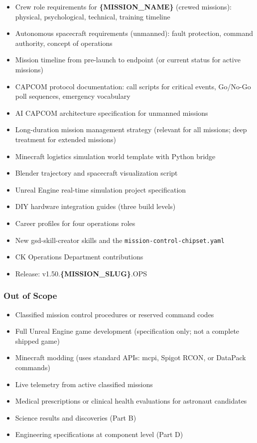 \documentclass[11pt,letterpaper]{article}
\newcommand{\param}[1]{\textcolor{paramred}{\textbf{\{#1\}}}}
\begin{document}
\begin{itemize}[leftmargin=*, itemsep=2pt]
  \item Crew role requirements for \param{MISSION\_NAME} (crewed missions): physical, psychological, technical, training timeline
  \item Autonomous spacecraft requirements (unmanned): fault protection, command authority, concept of operations
  \item Mission timeline from pre-launch to endpoint (or current status for active missions)
  \item CAPCOM protocol documentation: call scripts for critical events, Go/No-Go poll sequences, emergency vocabulary
  \item AI CAPCOM architecture specification for unmanned missions
  \item Long-duration mission management strategy (relevant for all missions; deep treatment for extended missions)
  \item Minecraft logistics simulation world template with Python bridge
  \item Blender trajectory and spacecraft visualization script
  \item Unreal Engine real-time simulation project specification
  \item DIY hardware integration guides (three build levels)
  \item Career profiles for four operations roles
  \item New gsd-skill-creator skills and the \texttt{mission-control-chipset.yaml}
  \item CK Operations Department contributions
  \item Release: v1.50.\param{MISSION\_SLUG}.OPS
\end{itemize}

\subsubsection{Out of Scope}

\begin{itemize}[leftmargin=*, itemsep=2pt]
  \item Classified mission control procedures or reserved command codes
  \item Full Unreal Engine game development (specification only; not a complete shipped game)
  \item Minecraft modding (uses standard APIs: mcpi, Spigot RCON, or DataPack commands)
  \item Live telemetry from active classified missions
  \item Medical prescriptions or clinical health evaluations for astronaut candidates
  \item Science results and discoveries (Part B)
  \item Engineering specifications at component level (Part D)
\end{itemize}
\end{document}

